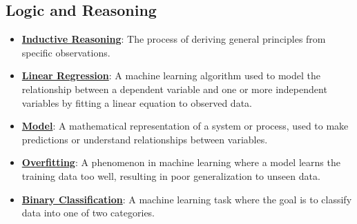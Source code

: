 \documentclass{article}%
\begin{document}
\subsection{Logic and Reasoning}%
\label{subsec:LogicandReasoning}%
\begin{itemize}[leftmargin=*]%
\item \href{https://purdue.brightspace.com/d2l/common/assets/pdfjs-d2l-dist/1.0.14-legacy/web/viewer.html?file=\%2Fcontent\%2Fenforced\%2F1095467-wl.202510.CS.24300.001\%2F05L2-ML Basics.pdf\%3Fou\%3D1095467\&lang=en-us\&container=d2l-fileviewer-rendered-pdf\&fullscreen=d2l-fileviewer-rendered-pdf-dialog\&height=667#page=3}{\textbf{Inductive Reasoning}}: The process of deriving general principles from specific observations.%
\item \href{https://purdue.brightspace.com/d2l/common/assets/pdfjs-d2l-dist/1.0.14-legacy/web/viewer.html?file=\%2Fcontent\%2Fenforced\%2F1095467-wl.202510.CS.24300.001\%2F05L2-ML Basics.pdf\%3Fou\%3D1095467\&lang=en-us\&container=d2l-fileviewer-rendered-pdf\&fullscreen=d2l-fileviewer-rendered-pdf-dialog\&height=667#page=6}{\textbf{Linear Regression}}: A machine learning algorithm used to model the relationship between a dependent variable and one or more independent variables by fitting a linear equation to observed data.%
\item \href{https://purdue.brightspace.com/d2l/common/assets/pdfjs-d2l-dist/1.0.14-legacy/web/viewer.html?file=\%2Fcontent\%2Fenforced\%2F1095467-wl.202510.CS.24300.001\%2F05L2-ML Basics.pdf\%3Fou\%3D1095467\&lang=en-us\&container=d2l-fileviewer-rendered-pdf\&fullscreen=d2l-fileviewer-rendered-pdf-dialog\&height=667#page=5}{\textbf{Model}}: A mathematical representation of a system or process, used to make predictions or understand relationships between variables.%
\item \href{https://purdue.brightspace.com/d2l/common/assets/pdfjs-d2l-dist/1.0.14-legacy/web/viewer.html?file=\%2Fcontent\%2Fenforced\%2F1095467-wl.202510.CS.24300.001\%2F05L2-ML Basics.pdf\%3Fou\%3D1095467\&lang=en-us\&container=d2l-fileviewer-rendered-pdf\&fullscreen=d2l-fileviewer-rendered-pdf-dialog\&height=667#page=14}{\textbf{Overfitting}}: A phenomenon in machine learning where a model learns the training data too well, resulting in poor generalization to unseen data.%
\item \href{https://purdue.brightspace.com/d2l/common/assets/pdfjs-d2l-dist/1.0.14-legacy/web/viewer.html?file=\%2Fcontent\%2Fenforced\%2F1095467-wl.202510.CS.24300.001\%2F05L2-ML Basics.pdf\%3Fou\%3D1095467\&lang=en-us\&container=d2l-fileviewer-rendered-pdf\&fullscreen=d2l-fileviewer-rendered-pdf-dialog\&height=667#page=20}{\textbf{Binary Classification}}: A machine learning task where the goal is to classify data into one of two categories.%

\end{itemize}
\end{document}

